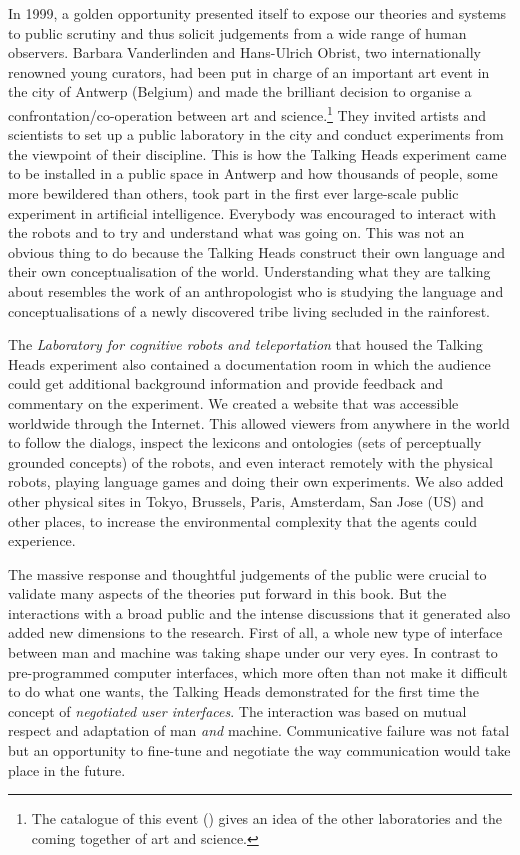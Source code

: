 In 1999, a golden opportunity presented itself to 
expose our theories and systems to public scrutiny and thus solicit
judgements from a wide range of human observers. Barbara
Vanderlinden and Hans-Ulrich Obrist, two internationally 
renowned young curators, had been put in charge of 
an important art event in the city of Antwerp (Belgium)
and made the brilliant decision to organise a 
confrontation/co-operation between art and 
science.\footnote{The catalogue of this event (\citealt{Obrist:1999}) gives an idea of 
the other laboratories and the coming together of art and science.}
They invited 
artists and scientists to set up 
a public laboratory in the city and conduct experiments 
from the viewpoint of their discipline. This is how 
the Talking Heads experiment came to be installed in 
a public space in Antwerp and how thousands of people, 
some more bewildered than others, took part in the first
ever large-scale public experiment in artificial intelligence. 
Everybody was encouraged to interact with the robots and 
to try and understand what was going on. This was not an obvious
thing to do because the Talking Heads
construct their own language and their own conceptualisation of 
the world. Understanding what they are talking about resembles the work 
of an anthropologist who is studying the language and
conceptualisations of a newly discovered tribe living
secluded in the rainforest. 

The {\it Laboratory for cognitive robots and 
teleportation} that housed the 
Talking Heads experiment also contained  
a documentation room in which the audience could 
get additional background information and 
provide feedback and commentary 
on the experiment. We created a website that was accessible 
worldwide through the Internet. This allowed viewers from anywhere
in the world to follow the dialogs, inspect the lexicons
and ontologies (sets of perceptually grounded concepts) 
of the robots, and even interact remotely with the 
physical robots, playing language games 
and doing their own experiments. We also added
other physical sites in Tokyo, Brussels, Paris, Amsterdam, 
San Jose (US) and other places, to increase the environmental complexity that 
the agents could experience. 

The massive response and thoughtful judgements of the 
public were crucial to validate many aspects of the 
theories put forward in this book. 
But the interactions with a broad public and
the intense discussions that it generated also added new
dimensions to the research. First of all, a whole 
new type of interface between man and machine was
taking shape under our very eyes. In contrast to pre-programmed
computer interfaces, which more often than not make it
difficult to do what one wants, the Talking Heads demonstrated
for the first time the concept of {\itshape negotiated user
interfaces}. The interaction was based on mutual respect
and adaptation of man {\itshape and} machine. Communicative
failure was not fatal but 
an opportunity to fine-tune and negotiate the way communication
would take place in the future. 

